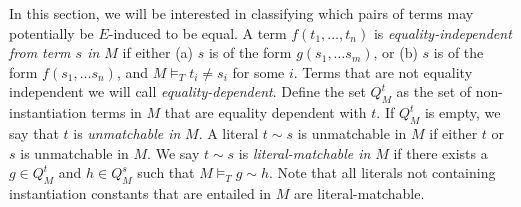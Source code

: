 \documentclass{llncs}
\begin{document}
\begin{comment}

\begin{lemma}
\label{lem:e-ind}
For each $E \in e\_ind(t,g,M,\psi)$, we have that $M \backslash t = g, E \models_T t = g$
\end{lemma}
\begin{proof}
The proof is by induction on the structure of $t$, with the induction hypothesis $M \backslash t = g, E \models_T t = g$.
If $t$ is an instantiation constant, then clearly $M \backslash t = g, t = rep( g ) \models_T t = g$.

Otherwise, the only other relevant case to consider is when $t$ is of the form $f( \bar{t_a} )$ and $g$ is of the form $f( \bar{ g_a } )$ (for all other cases, $e\_ind$ returns the empty set).
By congruence, it suffices to show for each $E$ in the constructed set $S$, we have that all the arguments of $t$ and $g$ are $E$-induced in $M$, or in other words $M \backslash t = g, E \models_T t_1 = g_1 \wedge \ldots \wedge t_n = g_n$.

Say we have constructed a set of equality sets $S_{i-1}$ such that $M \backslash t = g, E \models t_1 = g_1 \wedge \ldots \wedge t_{i-1} = g_{i-1}$ for each $E \in S_{i-1}$.
Our goal is to show that $e\_ind$ constructs an $S_i$ on the $i^{th}$ iteration such that for each $E \in S_i$, $M \backslash t = g, E \models_T t_1 = g_1 \wedge \ldots \wedge t_{i-1} = g_{i-1} \wedge t_i = g_i$.
In the case that $M \models_T t_i = g_i$, then $S_i$ is equal to $S_{i-1}$ and the statement holds immediately.
In the case that $M \not\models_T t_i = g_i$, then we may construct a set $S'$. 
Note that by our induction hypothesis, $M \backslash t_i = g_i, E \models_T t_i = g_i$ for each $E \in S'$.
We take $S_i$ to be the merge of $S_{i-1}$ and $S'$.
Since each $E \in S_i$ contains all equalities from some $E_1 \in S_{i-1}$ and some $E_2 \in S'$, we have that $M \backslash t = g, E \models_T t_1 = g_1 \wedge \ldots \wedge t_{i-1} = g_{i-1} \wedge t_i = g_i$ for each $E \in S_i$. $\Box$
\end{proof}
\end{comment}

In this section, we will be interested in classifying which pairs of terms may potentially be $E$-induced to be equal.
A term $f( t_1, \ldots, t_n )$ is \emph{equality-independent from term $s$ in $M$} if either (a) $s$ is of the form $g( s_1, \ldots s_m )$, or (b) $s$ is of the form $f( s_1, \ldots s_n )$, and $M \models_T t_i \neq s_i$ for some $i$.
Terms that are not equality independent we will call \emph{equality-dependent}.
Define the set $Q^t_M$ as the set of non-instantiation terms in $M$ that are equality dependent with $t$.
If $Q^t_M$ is empty, we say that $t$ is \emph{unmatchable in} $M$.
A literal $t \sim s$ is unmatchable in $M$ if either $t$ or $s$ is unmatchable in $M$.
We say $t \sim s$ is \emph{literal-matchable in} $M$ if there exists a $g \in Q^t_M$ and $h \in Q^s_M$ such that $M \models_T g \sim h$.
Note that all literals not containing instantiation constants that are entailed in $M$ are literal-matchable.
\end{document}
